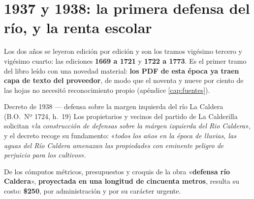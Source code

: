 \section{1937 y 1938: la primera defensa del río, y la renta escolar}

Los dos años se leyeron edición por edición y son los tramos vigésimo tercero y
vigésimo cuarto: las ediciones \textbf{1669 a 1721} y \textbf{1722 a 1773}. Es
el primer tramo del libro leído con una novedad material: \textbf{los PDF de
esta época ya traen capa de texto del proveedor}, de modo que el noventa y
nueve por ciento de las hojas no necesitó reconocimiento propio (apéndice
\ref{cap:fuentes}).

\begin{ficha}{Decreto de 1938 --- defensa sobre la margen izquierda del río La Caldera (B.O.\ Nº 1724, h.\ 19)}
Los propietarios y vecinos del partido de La Calderilla solicitan «\textit{la construcción de defensas sobre la
márgen izquierda del Rio Caldera}», y el decreto recoge su fundamento:
«\textit{todos los años en la época de lluvias, las aguas del Río Caldera
amenazan las propiedades con eminente peligro de perjuicio para los
cultivos}».

De los cómputos métricos, presupuestos y croquis de la obra «\textbf{defensa río
Caldera}», \textbf{proyectada en una longitud de cincuenta metros}, resulta su
costo: \textbf{\$250}, por administración y por su carácter urgente.
\end{ficha}

